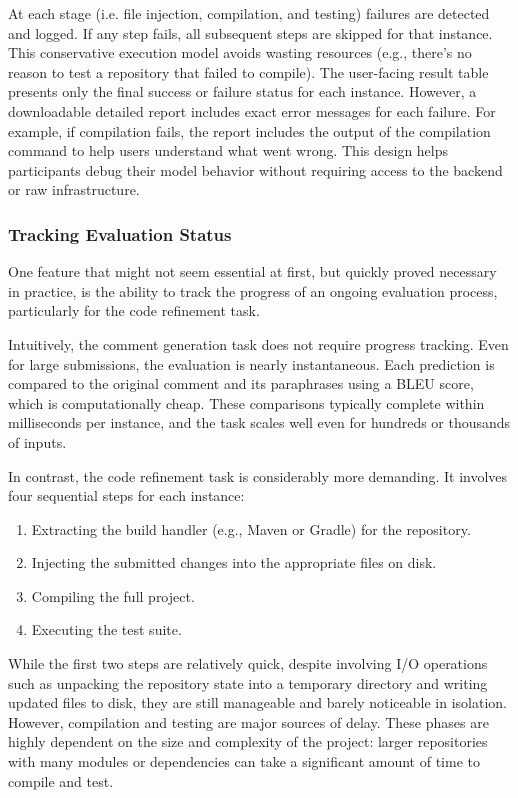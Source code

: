 At each stage (i.e. file injection, compilation, and testing) failures are detected and logged. If
any step fails, all subsequent steps are skipped for that instance. This conservative execution
model avoids wasting resources (e.g., there's no reason to test a repository that failed to
compile). The user-facing result table presents only the final success or failure status for each
instance. However, a downloadable detailed report includes exact error messages for each failure.
For example, if compilation fails, the report includes the output of the compilation command to help
users understand what went wrong. This design helps participants debug their model behavior without
requiring access to the backend or raw infrastructure.


\subsubsection{Tracking Evaluation Status}

One feature that might not seem essential at first, but quickly proved necessary in practice, is the
ability to track the progress of an ongoing evaluation process, particularly for the code refinement
task.

Intuitively, the comment generation task does not require progress tracking. Even for large
submissions, the evaluation is nearly instantaneous. Each prediction is compared to the original
comment and its paraphrases using a BLEU score, which is computationally cheap. These comparisons
typically complete within milliseconds per instance, and the task scales well even for hundreds or
thousands of inputs.

In contrast, the code refinement task is considerably more demanding. It involves four sequential
steps for each instance:
\begin{enumerate}
    \item Extracting the build handler (e.g., Maven or Gradle) for the repository.
    \item Injecting the submitted changes into the appropriate files on disk.
    \item Compiling the full project.
    \item Executing the test suite.
\end{enumerate}

While the first two steps are relatively quick, despite involving I/O operations such as unpacking
the repository state into a temporary directory and writing updated files to disk, they are still
manageable and barely noticeable in isolation. However, compilation and testing are major sources of
delay. These phases are highly dependent on the size and complexity of the project: larger
repositories with many modules or dependencies can take a significant amount of time to compile and
test.

